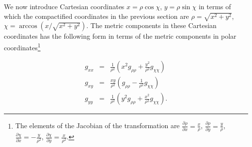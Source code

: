 \documentclass[prl,twocolumn,superscriptaddress]{revtex4-1}
\begin{document}
We now introduce Cartesian coordinates $x=\rho\cos\chi$, $y=\rho\sin\chi$ in terms of which the compactified coordinates in the previous section are $\rho=\sqrt{x^2+y^2}$, $\chi=\arccos\left( x/\sqrt{x^2+y^2} \right)$.
The metric components in these Cartesian coordinates has the following form in terms of the metric components in polar coordinates\footnote{The elements of the Jacobian of the transformation are
$\frac{\partial \rho}{\partial x} = \frac{x}{\rho}$,
$\frac{\partial \rho}{\partial y} = \frac{y}{\rho}$,
$\frac{\partial \chi}{\partial x} = -\frac{y}{\rho^2}$,
$\frac{\partial \chi}{\partial y} = \frac{x}{\rho^2}$.
}

\begin{eqnarray}\label{eqn:cartesianmetric_components}
g_{xx} &=& \frac{1}{\rho^2} \left( x^2 g_{\rho\rho} + \frac{y^2}{\rho^2} g_{\chi\chi} \right) \nonumber \\
g_{xy} &=& \frac{xy}{\rho^2} \left( g_{\rho\rho} - \frac{1}{\rho^2} g_{\chi\chi} \right) \nonumber \\
g_{yy} &=& \frac{1}{\rho^2} \left( y^2 g_{\rho\rho} + \frac{x^2}{\rho^2} g_{\chi\chi} \right).
\end{eqnarray}



\end{document}
